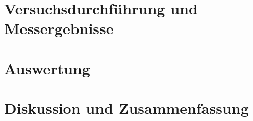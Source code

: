 \documentclass[11pt]{scrartcl}
\begin{document}
\section{Versuchsdurchführung und Messergebnisse}
\label{sec:versuchsdurchfuehrung_messergebnisse}

\section{Auswertung}
\label{sec:auswertung}

\section{Diskussion und Zusammenfassung}
\label{sec:diskussion_zusammenfassung}

\printbibliography

\listoffigures

\listoftables
\end{document}

